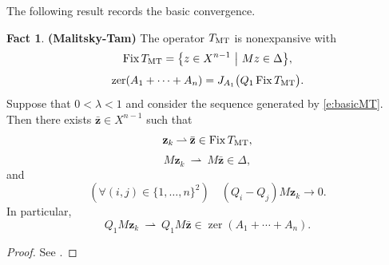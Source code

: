 \documentclass[11pt]{article}
\newcommand{\bz}{\ensuremath{\mathbf{z}}}
\newcommand{\weakly}{\ensuremath{\:{\rightharpoonup}\:}}
\newcommand{\menge}[2]{\big\{{#1}~\big |~{#2}\big\}}
\newcommand{\zer}{\ensuremath{\operatorname{zer}}}
\newcommand{\Fix}{\ensuremath{\operatorname{Fix}}}
\newcommand{\tmt}{\ensuremath{T_{\text{\scriptsize MT}}}}
\theoremstyle{definition}
\newtheorem{fact}[theorem]{Fact}
\providecommand{\zer}{\operatorname{zer}}
\begin{document}
{The following result records the basic convergence. 

\begin{fact} {\bf (Malitsky-Tam)} 
\label{f:MT}
The operator
$\tmt$ is nonexpansive with 
\begin{equation}
\label{e:fixtmt}
\Fix \tmt = 
\menge{z\in X^{n-1}}{Mz \in \Delta},
\end{equation}
\begin{equation*}
\zer(A_1+\cdots+A_n) = J_{A_1}\big(Q_1\Fix\tmt\big).
\end{equation*}
Suppose that $0<\lambda<1$ and 
consider the sequence generated by 
\cref{e:basicMT}. 
Then there exists $\bar{\bz}\in X^{n-1}$ such that 
\begin{equation*}
\bz_k\weakly \bar{\bz} \in \Fix\tmt, 
\end{equation*}
\begin{equation*}
M\bz_{k} \weakly M\bar{\bz}\in\Delta,
\end{equation*}
and 
\begin{equation}
\label{e:210817a}
(\forall (i,j)\in\{1,\ldots,n\}^2)\quad 
(Q_i-Q_j)M\bz_k\to 0. 
\end{equation}
In particular,
\begin{equation*}
Q_1 M\bz_k \weakly Q_1 M\bar{\bz}\in \zer(A_1+\cdots+A_n). 
\end{equation*}
\end{fact}
\begin{proof}
See \cite{MT}. 
\end{proof}

}
\end{document}
